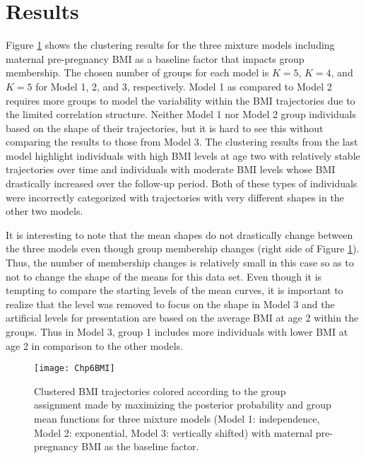 \section{Results}
Figure \ref{fig:6-1} shows the clustering results for the three mixture models including maternal pre-pregnancy BMI as a baseline factor that impacts group membership. The chosen number of groups for each model is $K = 5$, $K=4$, and $K=5$ for Model 1, 2, and 3, respectively. Model 1 as compared to Model 2 requires more groups to model the variability within the BMI trajectories due to the limited correlation structure. Neither Model 1 nor Model 2 group individuals based on the shape of their trajectories, but it is hard to see this without comparing the results to those from Model 3. The clustering results from the last model highlight individuals with high BMI levels at age two with relatively stable trajectories over time and individuals with moderate BMI levels whose BMI drastically increased over the follow-up period. Both of these types of individuals were incorrectly categorized with trajectories with very different shapes in the other two models.

It is interesting to note that the mean shapes do not drastically change between the three models even though group membership changes (right side of Figure \ref{fig:6-1}). Thus, the number of membership changes is relatively small in this case so as to not to change the shape of the means for this data set. Even though it is tempting to compare the starting levels of the mean curves, it is important to realize that the level was removed to focus on the shape in Model 3 and the artificial levels for presentation are based on the average BMI at age 2 within the groups. Thus in Model 3, group 1 includes more individuals with lower BMI at age 2 in comparison to the other models. 

\begin{figure}[h]
\centering
\texttt{[image: Chp6BMI]}
\caption{Clustered BMI trajectories colored according to the group assignment made by maximizing the posterior probability and group mean functions for three mixture models (Model 1: independence, Model 2: exponential, Model 3: vertically shifted) with maternal pre-pregnancy BMI as the baseline factor.}
\label{fig:6-1}
\end{figure}

